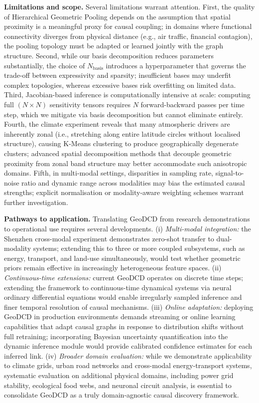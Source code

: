 \documentclass{article}
\begin{document}
\textbf{Limitations and scope.}
Several limitations warrant attention. First, the quality of Hierarchical Geometric Pooling depends on the assumption that spatial proximity is a meaningful proxy for causal coupling; in domains where functional connectivity diverges from physical distance (e.g., air traffic, financial contagion), the pooling topology must be adapted or learned jointly with the graph structure. Second, while our basis decomposition reduces parameters substantially, the choice of $N_{\mathrm{basis}}$ introduces a hyperparameter that governs the trade-off between expressivity and sparsity; insufficient bases may underfit complex topologies, whereas excessive bases risk overfitting on limited data. Third, Jacobian-based inference is computationally intensive at scale: computing full $(N \times N)$ sensitivity tensors requires $N$ forward-backward passes per time step, which we mitigate via basis decomposition but cannot eliminate entirely. Fourth, the climate experiment reveals that many atmospheric drivers are inherently zonal (i.e., stretching along entire latitude circles without localised structure), causing K-Means clustering to produce geographically degenerate clusters; advanced spatial decomposition methods that decouple geometric proximity from zonal band structure may better accommodate such anisotropic domains. Fifth, in multi-modal settings, disparities in sampling rate, signal-to-noise ratio and dynamic range across modalities may bias the estimated causal strengths; explicit normalisation or modality-aware weighting schemes warrant further investigation.

\textbf{Pathways to application.}
Translating GeoDCD from research demonstrations to operational use requires several developments. (i) \textit{Multi-modal integration:} the Shenzhen cross-modal experiment demonstrates zero-shot transfer to dual-modality systems; extending this to three or more coupled subsystems, such as energy, transport, and land-use simultaneously, would test whether geometric priors remain effective in increasingly heterogeneous feature spaces. (ii) \textit{Continuous-time extensions:} current GeoDCD operates on discrete time steps; extending the framework to continuous-time dynamical systems via neural ordinary differential equations would enable irregularly sampled inference and finer temporal resolution of causal mechanisms. (iii) \textit{Online adaptation:} deploying GeoDCD in production environments demands streaming or online learning capabilities that adapt causal graphs in response to distribution shifts without full retraining; incorporating Bayesian uncertainty quantification into the dynamic inference module would provide calibrated confidence estimates for each inferred link. (iv) \textit{Broader domain evaluation:} while we demonstrate applicability to climate grids, urban road networks and cross-modal energy-transport systems, systematic evaluation on additional physical domains, including power grid stability, ecological food webs, and neuronal circuit analysis, is essential to consolidate GeoDCD as a truly domain-agnostic causal discovery framework.
\end{document}
